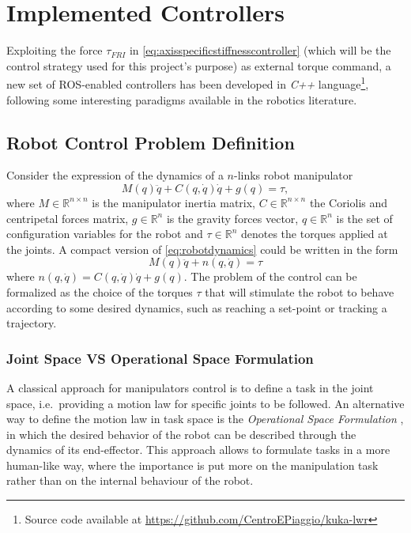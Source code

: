  \section{Implemented Controllers}\nocite{siciliano09}\nocite{bicchi13}
Exploiting the force $\tau_{FRI}$ in \eqref{eq:axisspecificstiffnesscontroller} (which will be the control strategy used for this project's purpose) as external torque command, a new set of ROS-enabled controllers has been developed in \textit{C++} language\footnote{Source code available at \url{https://github.com/CentroEPiaggio/kuka-lwr}}, following some interesting paradigms available in the robotics literature.

\subsection{Robot Control Problem Definition}
Consider the expression of the dynamics of a $n$-links robot manipulator
\begin{equation}
M(q)\ddot{q} + C(q,\dot{q})\dot{q} + g(q) = \tau,
\label{eq:robotdynamics}
\end{equation}
where $M\in\mathbb{R}^{n \times n}$ is the manipulator inertia matrix, $C\in\mathbb{R}^{n \times n}$ the Coriolis and centripetal forces matrix, $g\in\mathbb{R}^n$ is the gravity forces vector, $q\in\mathbb{R}^n$ is the set of configuration variables for the robot and $\tau\in\mathbb{R}^n$ denotes the torques applied at the joints. A compact version of \eqref{eq:robotdynamics} could be written in the form
\begin{equation}
M(q)\ddot{q} + n(q,\dot{q}) = \tau
\label{eq:compactrobotdynamics}
\end{equation}
where $n(q,\dot{q}) = C(q,\dot{q})\dot{q} + g(q)$. The problem of the control can be formalized as the choice of the torques $ \tau $ that will stimulate the robot to behave according to some desired dynamics, such as reaching a set-point or tracking a trajectory.
\subsubsection{Joint Space VS Operational Space Formulation}
A classical approach for manipulators control is to define a task in the joint space, i.e.\ providing a motion law for specific joints to be followed. An alternative way to define the motion law in task space is the \textit{Operational Space Formulation} \cite{khatib87}, in which the desired behavior of the robot can be described through the dynamics of its end-effector. This approach allows to formulate tasks in a more human-like way, where the importance is put more on the manipulation task rather than on the internal behaviour of the robot.

